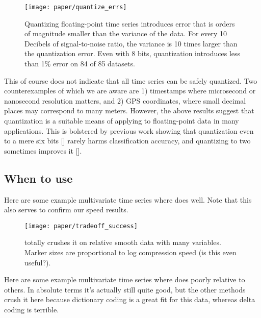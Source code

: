 \begin{figure}[h]
\begin{center}
    \texttt{[image: paper/quantize\_errs]}
    \caption{Quantizing floating-point time series introduces error that is orders of magnitude smaller than the variance of the data. For every 10 Decibels of signal-to-noise ratio, the variance is 10 times larger than the quantization error. Even with 8 bits, quantization introduces less than 1\% error on 84 of 85 datasets.}
    \label{fig:quantize_errs}
\end{center}
\end{figure}

This of course does not indicate that all time series can be safely quantized. Two counterexamples of which we are aware are 1) timestamps where microsecond or nanosecond resolution matters, and 2) GPS coordinates, where small decimal places may correspond to many meters. However, the above results suggest that quantization is a suitable means of applying \minesp to floating-point data in many applications. This is bolstered by previous work showing that quantization even to a mere six bits [] rarely harms classification accuracy, and quantizing to two sometimes improves it [].

\subsection{When to use \mine}

Here are some example multivariate time series where \minesp does well. Note that this also serves to confirm our speed results.

\begin{figure}[h]
\begin{center}
    \texttt{[image: paper/tradeoff\_success]}
    \caption{\minesp totally crushes it on relative smooth data with many variables. Marker sizes are proportional to log compression speed (is this even useful?).}
    \label{fig:tradeoff_success}
\end{center}
\end{figure}

Here are some example multivariate time series where \minesp does poorly relative to others. In absolute terms it's actually still quite good, but the other methods crush it here because dictionary coding is a great fit for this data, whereas delta coding is terrible.

